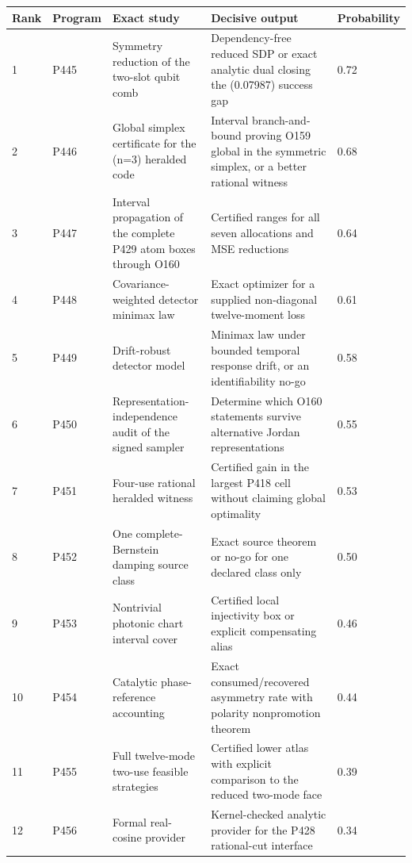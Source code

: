 \documentclass[11pt,a4paper,openany]{report}
\begin{document}
\begin{center}
\begingroup\fontsize{7}{8.4}\selectfont
\setlength{\tabcolsep}{2.5pt}
\renewcommand{\arraystretch}{1.16}
\begin{longtable}{@{}p{}p{}p{}p{}p{}@{}}
\toprule
\textbf{Rank} & \textbf{Program} & \textbf{Exact study} & \textbf{Decisive output} & \textbf{Probability} \\
\midrule
\endhead
1 & P445 & Symmetry reduction of the two-slot qubit comb & Dependency-free reduced SDP or exact analytic dual closing the (0.07987) success gap & 0.72 \\
2 & P446 & Global simplex certificate for the (n=3) heralded code & Interval branch-and-bound proving O159 global in the symmetric simplex, or a better rational witness & 0.68 \\
3 & P447 & Interval propagation of the complete P429 atom boxes through O160 & Certified ranges for all seven allocations and MSE reductions & 0.64 \\
4 & P448 & Covariance-weighted detector minimax law & Exact optimizer for a supplied non-diagonal twelve-moment loss & 0.61 \\
5 & P449 & Drift-robust detector model & Minimax law under bounded temporal response drift, or an identifiability no-go & 0.58 \\
6 & P450 & Representation-independence audit of the signed sampler & Determine which O160 statements survive alternative Jordan representations & 0.55 \\
7 & P451 & Four-use rational heralded witness & Certified gain in the largest P418 cell without claiming global optimality & 0.53 \\
8 & P452 & One complete-Bernstein damping source class & Exact source theorem or no-go for one declared class only & 0.50 \\
9 & P453 & Nontrivial photonic chart interval cover & Certified local injectivity box or explicit compensating alias & 0.46 \\
10 & P454 & Catalytic phase-reference accounting & Exact consumed/\allowbreak{}recovered asymmetry rate with polarity nonpromotion theorem & 0.44 \\
11 & P455 & Full twelve-mode two-use feasible strategies & Certified lower atlas with explicit comparison to the reduced two-mode face & 0.39 \\
12 & P456 & Formal real-cosine provider & Kernel-checked analytic provider for the P428 rational-cut interface & 0.34 \\
\bottomrule
\end{longtable}
\endgroup
\end{center}
\end{document}
